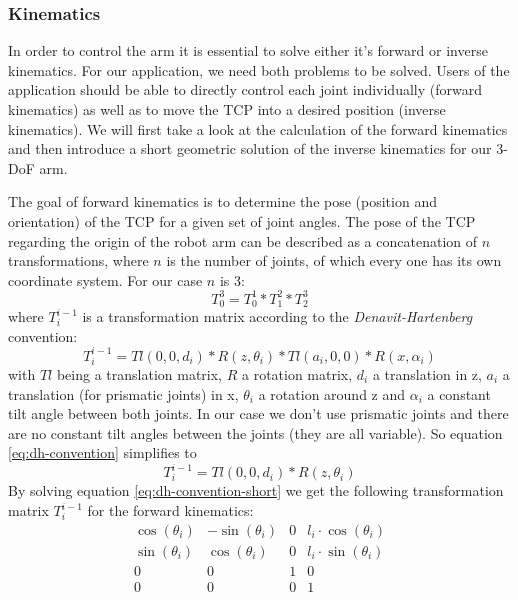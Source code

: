 \documentclass[conference]{IEEEtran}
\begin{document}
\subsubsection{Kinematics}\label{sec:kinematics}
In order to control the arm it is essential to solve either it's forward or inverse kinematics. For our application, we need both problems to be solved. Users of the application should be able to directly control each joint individually (forward kinematics) as well as to move the TCP into a desired position (inverse kinematics). We will first take a look at the calculation of the forward kinematics and then introduce a short geometric solution of the inverse kinematics for our 3-DoF arm.
\par
The goal of forward kinematics is to determine the pose (position and orientation) of the TCP for a given set of joint angles. The pose of the TCP regarding the origin of the robot arm can be described as a concatenation of $n$ transformations, where $n$ is the number of joints, of which every one has its own coordinate system. For our case $n$ is 3:
\begin{equation}\label{eq:trans_matrix}
T_0^3 = T_0^1 * T_1^2 * T_2^3
\end{equation}
where $T_i^{i-1}$ is a transformation matrix according to the \textit{Denavit-Hartenberg} convention:
\begin{equation}\label{eq:dh-convention}
T_i^{i-1} = Tl(0,0,d_i) * R(z, \theta_i) * Tl(a_i,0,0) * R(x, \alpha_i)
\end{equation}
with $Tl$ being a translation matrix, $R$ a rotation matrix, $d_i$ a translation in z, $a_i$ a translation (for prismatic joints) in x, $\theta_i$ a rotation around z and $\alpha_i$ a constant tilt angle between both joints. In our case we don't use prismatic joints and there are no constant tilt angles between the joints (they are all variable). So equation \ref{eq:dh-convention} simplifies to 
\begin{equation}\label{eq:dh-convention-short}
T_i^{i-1} = Tl(0,0,d_i) * R(z, \theta_i)
\end{equation}
By solving equation \ref{eq:dh-convention-short} we get the following transformation matrix $T_i^{i-1}$ for the forward kinematics:
\[
\begin{matrix}
\cos(\theta_i) & -\sin(\theta_i) & 0 & l_i \cdot \cos(\theta_i)  \\
\sin(\theta_i) & \cos(\theta_i) & 0 & l_i \cdot \sin(\theta_i) \\
0 & 0 & 1 & 0 \\
0 & 0 & 0 & 1
\end{matrix}
\]
\end{document}
